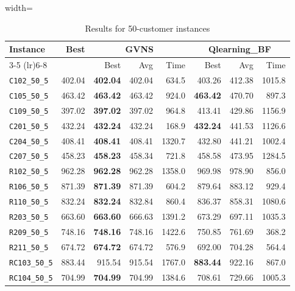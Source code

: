 \begin{table}[ht]
\centering
\small
\setlength{\tabcolsep}{5pt}
\caption{Results for 50-customer instances}
\vspace{4mm}
\begin{adjustbox}{width=\textwidth}
\begin{tabular}{l r r r r @{\hspace{8pt}} r r r @{\hspace{8pt}}}
\toprule
\multirow{2}{*}{Instance} & \multirow{2}{*}{Best} & \multicolumn{3}{c}{GVNS} & \multicolumn{3}{c}{Qlearning\_BF} \\
\cmidrule(lr){3-5} \cmidrule(lr){6-8}
 &  & Best & Avg & Time & Best & Avg & Time \\
\midrule
\texttt{C102\_50\_5} & 402.04 & \textbf{402.04} & 402.04 & 634.5 & 403.26 & 412.38 & 1015.8 \\
\texttt{C105\_50\_5} & 463.42 & \textbf{463.42} & 463.42 & 924.0 & \textbf{463.42} & 470.70 & 897.3 \\
\texttt{C109\_50\_5} & 397.02 & \textbf{397.02} & 397.02 & 964.8 & 413.41 & 429.86 & 1156.9 \\
\texttt{C201\_50\_5} & 432.24 & \textbf{432.24} & 432.24 & 168.9 & \textbf{432.24} & 441.53 & 1126.6 \\
\texttt{C204\_50\_5} & 408.41 & \textbf{408.41} & 408.41 & 1320.7 & 432.80 & 441.21 & 1002.4 \\
\texttt{C207\_50\_5} & 458.23 & \textbf{458.23} & 458.34 & 721.8 & 458.58 & 473.95 & 1284.5 \\
\texttt{R102\_50\_5} & 962.28 & \textbf{962.28} & 962.28 & 1358.0 & 969.98 & 978.90 & 856.0 \\
\texttt{R106\_50\_5} & 871.39 & \textbf{871.39} & 871.39 & 604.2 & 879.64 & 883.12 & 929.4 \\
\texttt{R110\_50\_5} & 832.24 & \textbf{832.24} & 832.84 & 860.4 & 836.37 & 858.31 & 1080.6 \\
\texttt{R203\_50\_5} & 663.60 & \textbf{663.60} & 666.63 & 1391.2 & 673.29 & 697.11 & 1035.3 \\
\texttt{R209\_50\_5} & 748.16 & \textbf{748.16} & 748.16 & 1422.6 & 750.85 & 761.69 & 368.2 \\
\texttt{R211\_50\_5} & 674.72 & \textbf{674.72} & 674.72 & 576.9 & 692.00 & 704.28 & 564.4 \\
\texttt{RC103\_50\_5} & 883.44 & 915.54 & 915.54 & 1767.0 & \textbf{883.44} & 922.16 & 867.0 \\
\texttt{RC104\_50\_5} & 704.99 & \textbf{704.99} & 704.99 & 1384.6 & 708.61 & 729.66 & 1005.3 \\

\end{tabular}
\end{adjustbox}
\end{table}
